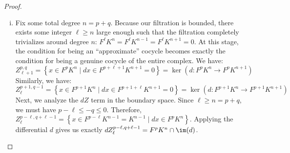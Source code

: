\begin{proof}
\begin{enumerate}[i.]
        Now, suppose $z \in B_{r+1}^{p,q}$. By definition, we can write $z=z_1+dz_2$ for $z_1 \in Z_r^{p+1,q-1}$ and $z_2\in Z_r^{p-r,q+r-1}$. Since $Z_r^{p+1,q-1}\subseteq Z_{r-1}^{p+1,q-1}\subseteq B_r^{p,q}$, the $z_1$ term vanishes in the quotient $E_r$, giving us $\bar{z} = \overline{z_1+dz_2} = \overline{dz_2}$. But since $z_2\in Z_r^{p-r,q+r-1}$, the exterior derivative $dz_2$ is exactly what $d_r$ produces. Thus $d_r\left(\overline{z_2}\right) = \overline{dz_2} =\bar z$. In other words, $\bar z$ is in the image of $d_r$. Taking the class of an element in $E_r^{p,q}$ therefore rigorously produces a well-defined map:
        $$
        Z_{r+1}^{p,q}/B_{r+1}^{p,q} \to \frac{\ker \left(d_r:E_r^{p,q} \to E_r^{p+r,q-r+1}\right)}{\im\left(d_r:E_r^{p-r,q+r-1} \to E_r^{p,q}\right)}
        $$
        
        To prove this is a bijection, we start with surjectivity. Let $\bar z \in \ker d_r$, and pick some representative $z\in Z_r^{p,q}$. The assumption $d_r(\bar z) = 0$ means the class of $dz$ in $E_r^{p+r,q-r+1}$ is zero, i.e., it is a boundary: $dz \in B_r^{p+r,q-r+1} = dZ_{r-1}^{p+1,q-1} +Z_{r-1}^{p+r+1,q-r}$. So there exists $w\in Z_{r-1}^{p+1,q-1}$ such that $d(z-w) \in Z_{r-1}^{p+r+1,q-r}\subseteq F^{p+r+1}K^{p+q+1}$. On the other hand, $z\in F^pK^{p+q}$ and $w\in F^{p+1}K^{p+q} \subseteq F^pK^{p+q}$, so their difference $z-w\in F^pK^{p+q}$. These two facts combined imply $z-w\in Z_{r+1}^{p,q}$. Because $w\in Z_{r-1}^{p+1,q-1}\subseteq B_r^{p,q}$, its class in the quotient is $\bar w=0$, making $\overline{z-w} = \bar z$. Hence, we have found an element $z-w$ in $Z_{r+1}^{p,q}$ that maps to $\bar z$, confirming surjectivity. (For brevity, we omit the straightforward but tedious proof for injectivity.)

        \item Fix some total degree $n = p+q$. Because our filtration is bounded, there exists some integer $\ell \ge n$ large enough such that the filtration completely trivializes around degree $n$: $F^\ell K^n = F^\ell K^{n-1} = F^\ell K^{n+1} =0$. At this stage, the condition for being an ``approximate'' cocycle becomes exactly the condition for being a genuine cocycle of the entire complex. We have:
        $$
        Z_{\ell+1}^{p,q} =\left\{x\in F^p K^n \mid dx\in F^{p+\ell+1} K^{n+1} = 0\right\}= \ker \left(d:F^pK^n\to F^pK^{n+1}\right)
        $$
        Similarly, we have:
        $$
        Z_{\ell}^{p+1,q-1} = \left\{x\in F^{p+1}K^n\mid dx\in F^{p+1+\ell} K^{n+1}=0\right\} = \ker \left(d:F^{p+1}K^n\to F^{p+1}K^{n+1}\right)
        $$
        Next, we analyze the $dZ$ term in the boundary space. Since $\ell \geq n=p+q$, we must have $p-\ell \leq -q \leq 0$. Therefore, $Z_\ell^{p-\ell,q+\ell-1} = \left\{x\in F^{p-\ell}K^{n-1} =K^{n-1}\mid dx\in F^p K^{n}\right\}$. Applying the differential $d$ gives us exactly $dZ_\ell^{p-\ell,q+\ell-1}=F^pK^n\cap \im (d)$. 
        

\end{enumerate}
\end{proof}
